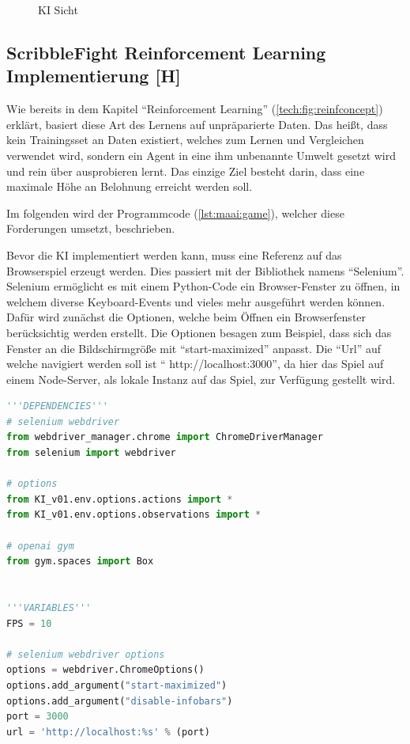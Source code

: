 \begin{figure}[H]
\begin{minipage}[t]{0.45\linewidth}
        \caption{KI Sicht}
        \label{maai:ai:visCopy:output}
    \end{minipage}
\end{figure}

\subsection{ScribbleFight Reinforcement Learning Implementierung [H]}
Wie bereits in dem Kapitel ``Reinforcement Learning'' (\ref{tech:fig:reinfconcept}) erklärt, basiert diese Art des Lernens auf unpräparierte Daten. Das heißt, dass kein Trainingsset an Daten existiert, welches zum Lernen und Vergleichen verwendet wird, sondern ein Agent in eine ihm unbenannte Umwelt gesetzt wird und rein über ausprobieren lernt. Das einzige Ziel besteht darin, dass eine maximale Höhe an Belohnung erreicht werden soll.

Im folgenden wird der Programmcode (\ref{lst:maai:game}), welcher diese Forderungen umsetzt, beschrieben.

Bevor die KI implementiert werden kann, muss eine Referenz auf das Browserspiel erzeugt werden. Dies passiert mit der Bibliothek namens ``Selenium''. Selenium ermöglicht es mit einem Python-Code ein Browser-Fenster zu öffnen, in welchem diverse Keyboard-Events und vieles mehr ausgeführt werden können. Dafür wird zunächst die Optionen, welche beim Öffnen ein Browserfenster berücksichtig werden erstellt. Die Optionen besagen zum Beispiel, dass sich das Fenster an die Bildschirmgröße mit ``start-maximized'' anpasst. Die ``Url'' auf welche navigiert werden soll ist `` http://localhost:3000'', da hier das Spiel auf einem Node-Server, als lokale Instanz auf das Spiel, zur Verfügung gestellt wird.

\begin{lstlisting}[language=Python,label=lst:maai:game,caption=Implementation der Logik der Reinforcement Learning KI]
'''DEPENDENCIES'''
# selenium webdriver
from webdriver_manager.chrome import ChromeDriverManager
from selenium import webdriver

# options
from KI_v01.env.options.actions import *
from KI_v01.env.options.observations import *

# openai gym
from gym.spaces import Box


'''VARIABLES'''
FPS = 10

# selenium webdriver options
options = webdriver.ChromeOptions()
options.add_argument("start-maximized")
options.add_argument("disable-infobars")
port = 3000
url = 'http://localhost:%s' % (port)

\end{lstlisting}

